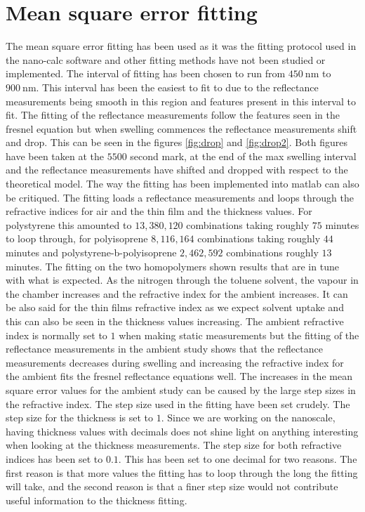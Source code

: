 \documentclass[MasterThesisMain.tex]{subfiles}
\begin{document}
\section{Mean square error fitting}
The mean square error fitting has been used as it was the fitting protocol used in the nano-calc software and other fitting methods have not been studied or implemented. The interval of fitting has been chosen to run from $\SI{450}{\nano\meter}$ to $\SI{900}{\nano\meter}$. This interval has been the easiest to fit to due to the reflectance measurements being smooth in this region and features present in this interval to fit. The fitting of the reflectance measurements follow the features seen in the fresnel equation but when swelling commences the reflectance measurements shift and drop. This can be seen in the figures \ref{fig:drop} and \ref{fig:drop2}. Both figures have been taken at the $5500$ second mark, at the end of the max swelling interval and the reflectance measurements have shifted and dropped with respect to the theoretical model. The way the fitting has been implemented into matlab can also be critiqued. The fitting loads a reflectance measurements and loops through the refractive indices for air and the thin film and the thickness values. For polystyrene this amounted to $13,380,120$ combinations taking roughly $75$ minutes to loop through, for polyisoprene $8,116,164$ combinations taking roughly $44$ minutes and polystyrene-b-polyisoprene $2,462,592$ combinations roughly $13$ minutes. The fitting on the two homopolymers shown results that are in tune with what is expected. As the nitrogen through the toluene solvent, the vapour in the chamber increases and the refractive index for the ambient increases. It can be also said for the thin films refractive index as we expect solvent uptake and this can also be seen in the thickness values increasing. The ambient refractive index is normally set to $1$ when making static measurements but the fitting of the reflectance measurements in the ambient study shows that the reflectance measurements decreases during swelling and increasing the refractive index for the ambient fits the fresnel reflectance equations well. The increases in the mean square error values for the ambient study can be caused by the large step sizes in the refractive index. The step size used in the  fitting have been set crudely. The step size for the thickness is set to $1$. Since we are working on the nanoscale, having thickness values with decimals does not shine light on anything interesting when looking at the thickness measurements. The step size for both refractive indices has been set to $0.1$. This has been set to one decimal for two reasons. The first reason is that more values the fitting has to loop through the long the fitting will take, and the second reason is that a finer step size would not contribute useful information to the thickness fitting.        
\end{document}
